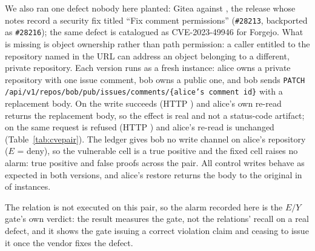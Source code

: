 We also ran one defect nobody here planted: Gitea \CveVulnVersion{} against \CveFixedVersion{},
the release whose notes record a security fix titled ``Fix comment permissions''
(\texttt{\#28213}, backported as \texttt{\#28216}); the same defect is catalogued as
CVE-2023-49946 for Forgejo. What is missing is object ownership rather than path permission: a
caller entitled to the repository named in the URL can address an object belonging to a
different, private repository. Each version runs as a fresh instance: alice owns a private
repository with one issue comment, bob owns a public one, and bob sends \texttt{PATCH\allowbreak
/api\allowbreak/v1\allowbreak/repos\allowbreak/bob\allowbreak/pub\allowbreak/issues\allowbreak/comments/\allowbreak\{alice's comment id\}}
with a replacement body. On \CveVulnVersion{} the write succeeds (HTTP \CveVulnStatus{}) and
alice's own re-read returns the replacement body, so the effect is real and not a status-code
artifact; on \CveFixedVersion{} the same request is refused (HTTP \CveFixedStatus{}) and
alice's re-read is unchanged (Table~\ref{tab:cvepair}). The ledger gives bob no write channel
on alice's repository ($E$ = deny), so the vulnerable cell is a true positive and the fixed
cell raises no alarm: \CveTruePositives{} true positive and \CveFalseProofs{} false proofs
across the pair. All \CveControls{} control writes behave as expected in both versions, and
alice's restore returns the body to the original in \CveRestored{} of \CveVersions{} instances.

The relation is not executed on this pair, so the alarm recorded here is the $E/Y$ gate's own
verdict: the result measures the gate, not the relations' recall on a real defect, and it
shows the gate issuing a correct violation claim and ceasing to issue it once the vendor fixes
the defect.

\begin{table}[t]
\centering
\caption{A publicly fixed defect (object-versus-path ownership). The verdict uses
$E$ from the ledger and $Y$ from the owner's re-read, not the write status.}
\label{tab:cvepair}
\small

\end{table}
